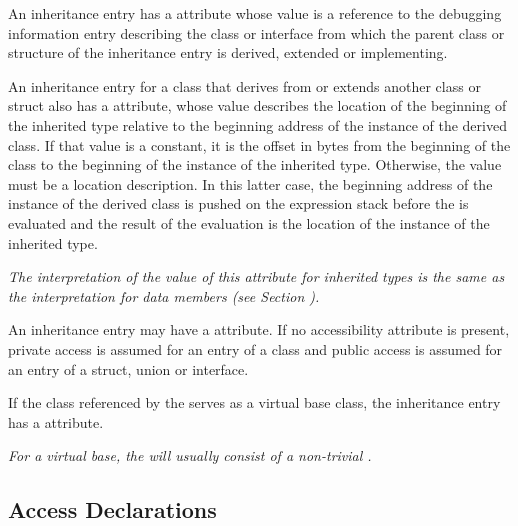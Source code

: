 An inheritance entry 
has 
a 
\DWATtype{} attribute whose value is
a reference to the debugging information entry describing the
class or interface from which the parent class or structure
of the inheritance entry is derived, extended or implementing.

An\hypertarget{chap:DWATdatamemberlocationinheritedmemberlocation}{} 
inheritance entry
for a class that derives from or extends
another class or struct also has a 
\DWATdatamemberlocationDEFN{} attribute, 
whose value describes the location of the beginning
of the inherited type relative to the beginning address of the
instance of the derived class. If that value is a constant, it is the offset
in bytes from the beginning of the class to the beginning of
the instance of the inherited type. Otherwise, the value must be a location
description. In this latter case, the beginning address of
the instance of the derived class is pushed on the expression stack before
the 
is evaluated and the result of the
evaluation is the location of the instance of the inherited type.

\textit{The interpretation of the value of this attribute for
inherited types is the same as the interpretation for data
members 
(see Section ).  }

An\hypertarget{chap:DWATaccessibilitycppinheritedmembers}{} 
inheritance entry may have a
\bb
\hyperlink{chap:DWATaccessibilityattribute}{\DWATaccessibilityNAME}
\eb
attribute.
If no accessibility attribute is present, private access 
is assumed for an entry of a class and public access is 
assumed for an entry of a struct, union or interface.

If the class referenced by the 
serves as a  virtual base class, the 
inheritance entry has a 
\bb
\hyperlink{chap:DWATvirtualityvirtualityindication}{\DWATvirtualityNAME} 
\eb
attribute.

\textit{For a  virtual base, the 
will usually consist of a non-trivial 
.}

\subsection{Access Declarations}
\label{chap:accessdeclarations}

